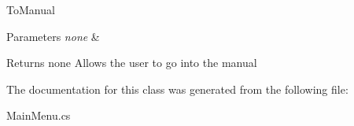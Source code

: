 To\+Manual 
\begin{DoxyParams}{Parameters}
{\em none} & \\
\hline
\end{DoxyParams}
\begin{DoxyReturn}{Returns}
none Allows the user to go into the manual 
\end{DoxyReturn}


The documentation for this class was generated from the following file\+:\begin{DoxyCompactItemize}
\item 
Main\+Menu.\+cs\end{DoxyCompactItemize}
